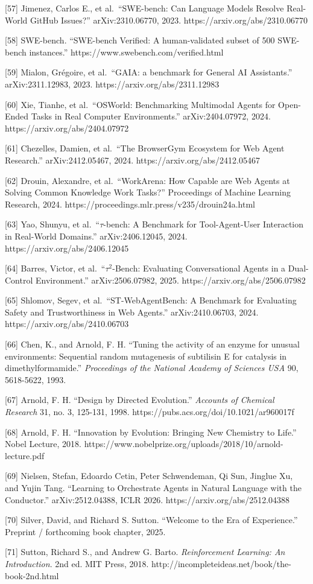 \documentclass[11pt]{article}
\begin{document}
{[}57{]} Jimenez, Carlos E., et al.~``SWE-bench: Can Language Models
Resolve Real-World GitHub Issues?'' arXiv:2310.06770, 2023.
https://arxiv.org/abs/2310.06770

{[}58{]} SWE-bench. ``SWE-bench Verified: A human-validated subset of
500 SWE-bench instances.'' https://www.swebench.com/verified.html

{[}59{]} Mialon, Grégoire, et al.~``GAIA: a benchmark for General AI
Assistants.'' arXiv:2311.12983, 2023. https://arxiv.org/abs/2311.12983

{[}60{]} Xie, Tianhe, et al.~``OSWorld: Benchmarking Multimodal Agents
for Open-Ended Tasks in Real Computer Environments.'' arXiv:2404.07972,
2024. https://arxiv.org/abs/2404.07972

{[}61{]} Chezelles, Damien, et al.~``The BrowserGym Ecosystem for Web
Agent Research.'' arXiv:2412.05467, 2024.
https://arxiv.org/abs/2412.05467

{[}62{]} Drouin, Alexandre, et al.~``WorkArena: How Capable are Web
Agents at Solving Common Knowledge Work Tasks?'' Proceedings of Machine
Learning Research, 2024.
https://proceedings.mlr.press/v235/drouin24a.html

{[}63{]} Yao, Shunyu, et al.~``\(\tau\)-bench: A Benchmark for
Tool-Agent-User Interaction in Real-World Domains.'' arXiv:2406.12045,
2024. https://arxiv.org/abs/2406.12045

{[}64{]} Barres, Victor, et al.~``\(\tau^2\)-Bench: Evaluating
Conversational Agents in a Dual-Control Environment.'' arXiv:2506.07982,
2025. https://arxiv.org/abs/2506.07982

{[}65{]} Shlomov, Segev, et al.~``ST-WebAgentBench: A Benchmark for
Evaluating Safety and Trustworthiness in Web Agents.'' arXiv:2410.06703,
2024. https://arxiv.org/abs/2410.06703

{[}66{]} Chen, K., and Arnold, F. H. ``Tuning the activity of an enzyme
for unusual environments: Sequential random mutagenesis of subtilisin E
for catalysis in dimethylformamide.'' \emph{Proceedings of the National
Academy of Sciences USA} 90, 5618-5622, 1993.

{[}67{]} Arnold, F. H. ``Design by Directed Evolution.'' \emph{Accounts
of Chemical Research} 31, no. 3, 125-131, 1998.
https://pubs.acs.org/doi/10.1021/ar960017f

{[}68{]} Arnold, F. H. ``Innovation by Evolution: Bringing New Chemistry
to Life.'' Nobel Lecture, 2018.
https://www.nobelprize.org/uploads/2018/10/arnold-lecture.pdf

{[}69{]}
Nielsen, Stefan, Edoardo Cetin, Peter Schwendeman, Qi Sun, Jinglue Xu,
and Yujin Tang. ``Learning to Orchestrate Agents in Natural Language
with the Conductor.'' arXiv:2512.04388, ICLR 2026.
https://arxiv.org/abs/2512.04388


{[}70{]} Silver, David, and Richard S. Sutton. ``Welcome to the Era of
Experience.'' Preprint / forthcoming book chapter, 2025.

{[}71{]} Sutton, Richard S., and Andrew G. Barto. \emph{Reinforcement
Learning: An Introduction}. 2nd ed. MIT Press, 2018.
http://incompleteideas.net/book/the-book-2nd.html

\endgroup
\end{document}
